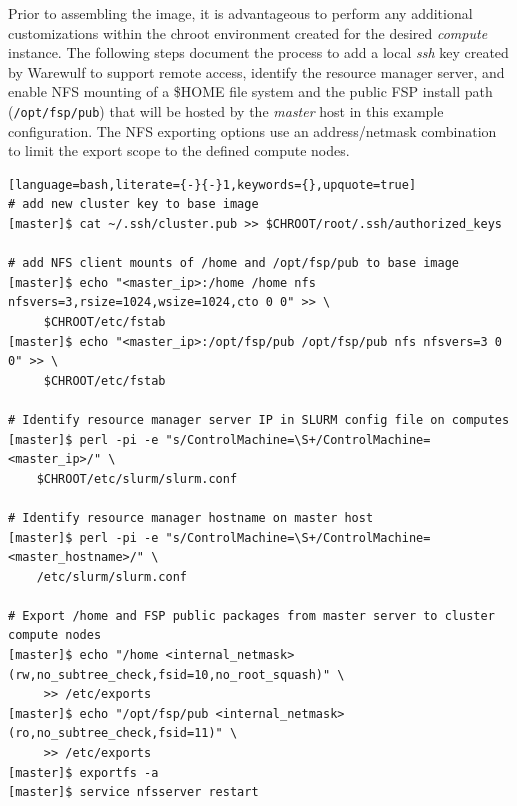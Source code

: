 \documentclass[letterpaper]{article}
\begin{document}
Prior to assembling the image, it is advantageous to perform any additional
customizations within the chroot environment created for the desired {\em
  compute} instance. The following steps document the process to add a local
{\em ssh} key created by Warewulf to support remote access, identify the
resource manager server, and enable NFS mounting of a \$HOME file system and
the public FSP install path (\texttt{/opt/fsp/pub}) that will be hosted by the
{\em master} host in this example configuration.  The NFS exporting options use
an address/netmask combination to limit the export scope to the defined compute nodes.


\begin{lstlisting}[language=bash,literate={-}{-}1,keywords={},upquote=true]
# add new cluster key to base image
[master]$ cat ~/.ssh/cluster.pub >> $CHROOT/root/.ssh/authorized_keys

# add NFS client mounts of /home and /opt/fsp/pub to base image
[master]$ echo "<master_ip>:/home /home nfs nfsvers=3,rsize=1024,wsize=1024,cto 0 0" >> \
     $CHROOT/etc/fstab
[master]$ echo "<master_ip>:/opt/fsp/pub /opt/fsp/pub nfs nfsvers=3 0 0" >> \
     $CHROOT/etc/fstab

# Identify resource manager server IP in SLURM config file on computes
[master]$ perl -pi -e "s/ControlMachine=\S+/ControlMachine=<master_ip>/" \
    $CHROOT/etc/slurm/slurm.conf

# Identify resource manager hostname on master host
[master]$ perl -pi -e "s/ControlMachine=\S+/ControlMachine=<master_hostname>/" \
    /etc/slurm/slurm.conf

# Export /home and FSP public packages from master server to cluster compute nodes
[master]$ echo "/home <internal_netmask>(rw,no_subtree_check,fsid=10,no_root_squash)" \
     >> /etc/exports
[master]$ echo "/opt/fsp/pub <internal_netmask>(ro,no_subtree_check,fsid=11)" \
     >> /etc/exports
[master]$ exportfs -a
[master]$ service nfsserver restart
\end{lstlisting}
\end{document}
